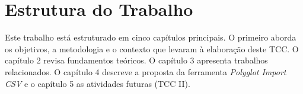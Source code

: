 \section{Estrutura do Trabalho}

Este trabalho está estruturado em cinco capítulos principais. O primeiro aborda os
objetivos, a metodologia e o contexto que levaram à elaboração deste TCC. O capítulo 2
revisa fundamentos teóricos. O capítulo 3 apresenta trabalhos relacionados. O capítulo 4
descreve a proposta da ferramenta \textit{Polyglot Import CSV} e o capítulo 5 as
atividades futuras (TCC II).
